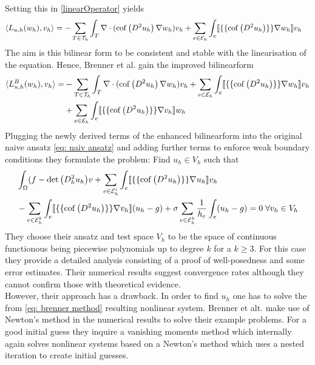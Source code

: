 Setting this in \eqref{linearOperator} yields 
\begin{align*}
	\langle L_{u,h}(w_h),v_h\rangle 
	     &=- \sum_{T \in \mathcal{T}_h}  \int_T \nabla \cdot (\operatorname{cof} \left( D^2 u_h \right) \nabla w_h) v_h
	    + \sum_{e \in \mathcal{E}_h} \int_{e} \llbracket \{\{\operatorname{cof} \left( D^2 u_h \right) \}\} \nabla w_h\rrbracket v_h
\end{align*}
The aim is this bilinear form to be consistent and stable with the linearisation of the \MA equation. Hence, Brenner et al. gain the improved bilinearform
\begin{align*}
	\langle L^B_{u,h}(w_h),v_h\rangle 
	    =&- \sum_{T \in \mathcal{T}_h}  \int_T \nabla \cdot (\operatorname{cof} \left( D^2 u_h \right) \nabla w_h) v_h
	    + \sum_{e \in \mathcal{E}_h} \int_{e} \llbracket \{\{\operatorname{cof} \left( D^2 u_h \right) \}\} \nabla w_h\rrbracket v_h \\
	    &+ \sum_{e \in \mathcal{E}_h} \int_{e} \llbracket \{\{\operatorname{cof} \left( D^2 u_h \right) \}\} \nabla v_h\rrbracket w_h
\end{align*}
Plugging the newly derived terms of the enhanced bilinearform into the original naive ansatz \eqref{eq: naiv ansatz} and adding further terms to enforce weak boundary conditions they formulate the problem: Find $u_h \in V_h$ such that
\begin{align}
\begin{split}
	&\int_{\Omega} (f-\det{\left(D^2_h u_h\right)} v 
	+ \sum_{e \in \mathcal{E}_h^i} \int_{e} \llbracket \{\{\operatorname{cof} \left( D^2 u_h \right) \}\} \nabla u_h\rrbracket v_h \\
	&- \sum_{e \in \mathcal{E}_h^b} \int_{e} \llbracket \{\{\operatorname{cof} \left( D^2 u_h \right) \}\} \nabla v_h\rrbracket (u_h -g) 
	+ \sigma  \sum_{e \in \mathcal{E}_h^b} \frac 1 {h_e} \int_{e} (u_h -g)  = 0 \; \forall v_h \in V_h \label{eq: brenner method}
\end{split}
\end{align}
They choose their ansatz and test space $V_h$ to be the space of continuous functionous being piecewise polynomials up to degree $k$ for a $k \geq 3$. For this case they provide a detailed analysis consisting of a proof of well-posedness and some error estimates. Their numerical results suggest convergence rates  although they cannot confirm those with theoretical evidence. \\
However, their approach has a drawback. In order to find $u_h$ one has to solve the from \eqref{eq: brenner method} resulting nonlinear system. Brenner et alt. make use of Newton's method in the numerical results to solve their example problems. For a good initial guess they inquire a vanishing moments method which internally again solves nonlinear systems based on a Newton's method which uses a nested iteration to create initial guesses. 

